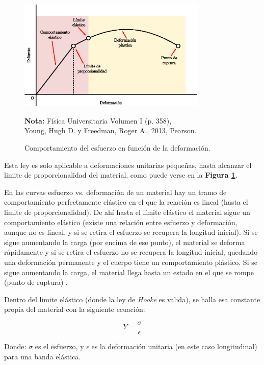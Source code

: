 \documentclass[letter,11pt]{article}
\newcommand{\source}[1]{\vspace{-11pt} \caption*{\small{\textbf{Nota:} {#1}}}}
\begin{document}
\begin{figure}
\centering
\includegraphics[width=0.80\textwidth]{resources/f1.eps}
\caption{Comportamiento del esfuerzo en función de la deformación.}
\label{figura1}
\source{Física Universitaria Volumen I (p. 358), \\
Young, Hugh D. y Freedman, Roger A., 2013, Pearson.}
\end{figure}

Esta ley es solo aplicable a deformaciones unitarias pequeñas, hasta alcanzar
el limite de proporcionalidad del material, como puede verse en la
\textbf{Figura \ref{figura1}}.

En las curvas esfuerzo vs. deformación de un material hay un tramo de
comportamiento perfectamente elástico en el que la relación es lineal (hasta el
limite de proporcionalidad). De ahí hasta el límite elástico el material sigue
un comportamiento elástico (existe una relación entre esfuerzo y deformación,
aunque no es lineal, y si se retira el esfuerzo se recupera la
longitud inicial). Si se sigue aumentando la carga (por encima de ese punto), el
material se deforma rápidamente y si se retira el esfuerzo no se recupera la
longitud inicial, quedando una deformación permanente y el cuerpo tiene un
comportamiento plástico. Si se sigue aumentando la carga, el material llega
hasta un estado en el que se rompe (punto de ruptura) \cite{Young&Freedman}.

Dentro del limite elástico (donde la ley de \emph{Hooke} es valida), se halla
esa constante propia del material con la siguiente ecuación:

\begin{equation}
    Y = \frac{\sigma}{\epsilon}
\label{young1}
\end{equation}
\vspace{0.10cm}

Donde: $\sigma$ es el esfuerzo, y $\epsilon$ es la deformación unitaria (en este
caso longitudinal) para una banda elástica.
\end{document}
